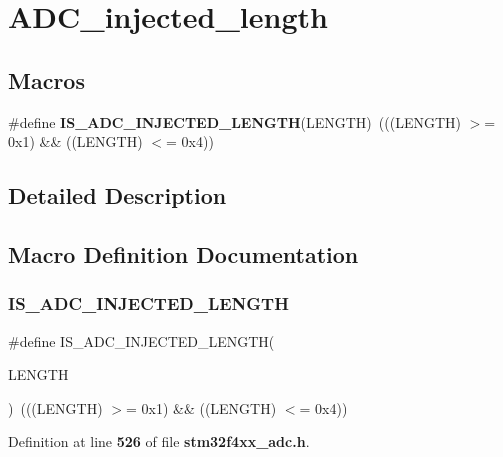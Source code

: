 \section{A\+D\+C\+\_\+injected\+\_\+length}
\label{group__ADC__injected__length}
\subsection*{Macros}
\begin{DoxyCompactItemize}
\item 
\#define \textbf{ I\+S\+\_\+\+A\+D\+C\+\_\+\+I\+N\+J\+E\+C\+T\+E\+D\+\_\+\+L\+E\+N\+G\+TH}(L\+E\+N\+G\+TH)~(((L\+E\+N\+G\+TH) $>$= 0x1) \&\& ((\+L\+E\+N\+G\+T\+H) $<$= 0x4))
\end{DoxyCompactItemize}


\subsection{Detailed Description}


\subsection{Macro Definition Documentation}
\mbox{\label{group__ADC__injected__length_gaecdddab7424a697722683296ca70e176}} 
\subsubsection{I\+S\+\_\+\+A\+D\+C\+\_\+\+I\+N\+J\+E\+C\+T\+E\+D\+\_\+\+L\+E\+N\+G\+TH}
{\footnotesize\ttfamily \#define I\+S\+\_\+\+A\+D\+C\+\_\+\+I\+N\+J\+E\+C\+T\+E\+D\+\_\+\+L\+E\+N\+G\+TH(\begin{DoxyParamCaption}\item[{}]{L\+E\+N\+G\+TH }\end{DoxyParamCaption})~(((L\+E\+N\+G\+TH) $>$= 0x1) \&\& ((\+L\+E\+N\+G\+T\+H) $<$= 0x4))}



Definition at line \textbf{ 526} of file \textbf{ stm32f4xx\+\_\+adc.\+h}.

